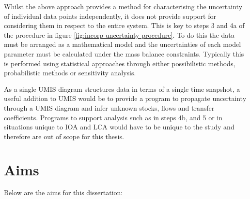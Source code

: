 \documentclass[ %
                    author={Tom Jager},
                supervisor={Dr. Daniel Schien},
                    degree={MEng},
                     title={A Bayesian Inference Engine for UMIS Structured Data},
                  subtitle={},
                      type={research},
                      year={2019} ]{dissertation}
\begin{document}

Whilst the above approach provides a method for characterising the uncertainty of individual data points independently, it does not provide support for considering them in respect to the entire system. This is key to steps 3 and 4a of the procedure in figure \ref{fig:incorp uncertainty procedure}. To do this the data must be arranged as a mathematical model and the uncertainties of each model parameter must be calculated under the mass balance constraints. Typically this is performed using statistical approaches through either possibilistic methods, probabilistic methods or sensitivity analysis. 

As a single UMIS diagram structures data in terms of a single time snapshot, a useful addition to UMIS would be to provide a program to propagate uncertainty through a UMIS diagram and infer unknown stocks, flows and transfer coefficients. Programs to support analysis such as in steps 4b, and 5 or in situations unique to IOA and LCA would have to be unique to the study and therefore are out of scope for this thesis.

\section{Aims}
Below are the aims for this dissertation:
\end{document}
